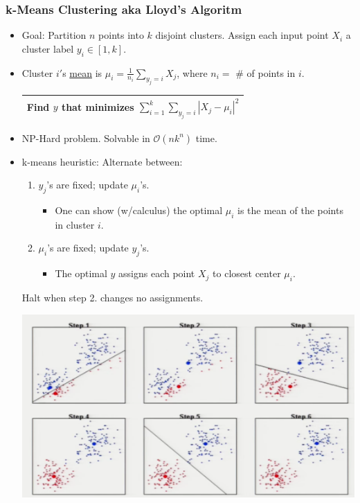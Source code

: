 \documentclass[10pt]{article}
\newcommand{\bigo}{\mathcal{O}}
\begin{document}
\subsubsection*{k-Means Clustering aka Lloyd's Algoritm}
\begin{itemize}
	\item Goal: Partition $n$ points into $k$ disjoint clusters. Assign each input point $X_{i}$ a cluster label $y_{i} \in [1, k].$
	\item Cluster $i'$s \underline{mean} is $\mu_{i} = \frac{1}{n_{i}} \sum_{y_{j}=i} X_{j}$, where $n_{i} =$ \# of points in $i$.
		\begin{center}
		\begin{tabular}{|c|}
			\hline
			Find $y$ that minimizes $\sum_{i=1}^{k} \sum_{y_{j}=i} |X_{j} - \mu_{i}|^{2}$\\
			\hline
		\end{tabular}
		\end{center}
	\item NP-Hard problem. Solvable in $\bigo(nk^{n})$ time.
	\item k-means heuristic: Alternate between:
		\begin{enumerate}
			\item $y_{j}$'s are fixed; update $\mu_{i}$'s.
				\begin{itemize}
					\item One can show (w/calculus) the optimal $\mu_{i}$ is the mean of the points in cluster $i$.
				\end{itemize}
			\item $\mu_{i}$'s are fixed; update $y_{j}$'s.
				\begin{itemize}
					\item The optimal $y$ assigns each point $X_{j}$ to closest center $\mu_{i}$.
				\end{itemize}
		\end{enumerate}
		Halt when step 2. changes no assignments.
		\begin{center}
			\includegraphics[scale=0.5]{../images/kmeansexample}

\end{center}
\end{itemize}
\end{document}
